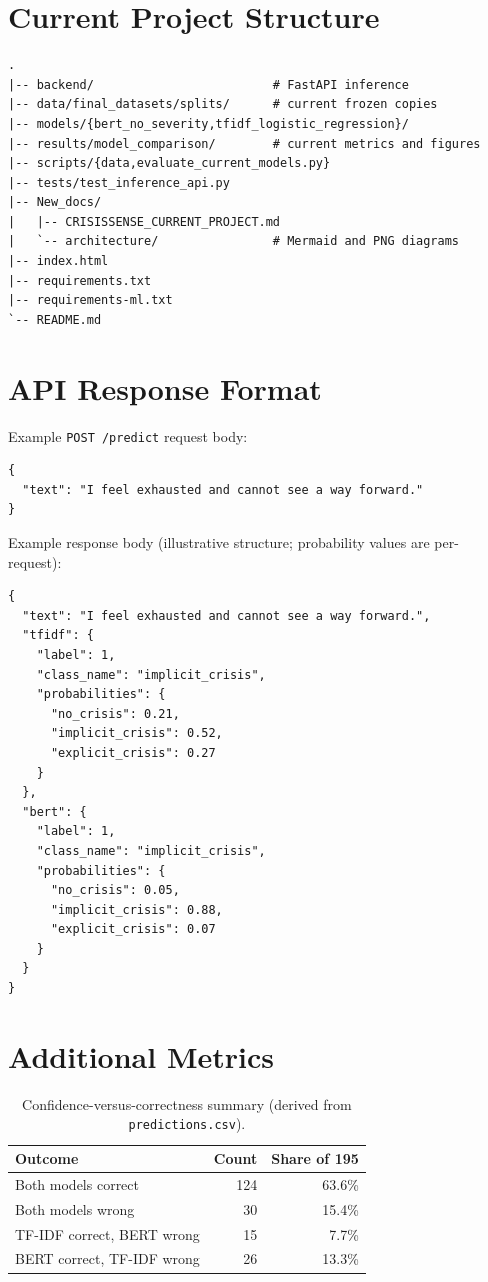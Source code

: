 \chapter{Current Project Structure}

\begin{lstlisting}
.
|-- backend/                         # FastAPI inference
|-- data/final_datasets/splits/      # current frozen copies
|-- models/{bert_no_severity,tfidf_logistic_regression}/
|-- results/model_comparison/        # current metrics and figures
|-- scripts/{data,evaluate_current_models.py}
|-- tests/test_inference_api.py
|-- New_docs/
|   |-- CRISISSENSE_CURRENT_PROJECT.md
|   `-- architecture/                # Mermaid and PNG diagrams
|-- index.html
|-- requirements.txt
|-- requirements-ml.txt
`-- README.md
\end{lstlisting}

\chapter{API Response Format}

Example \texttt{POST /\pbrk predict} request body:
\begin{lstlisting}
{
  "text": "I feel exhausted and cannot see a way forward."
}
\end{lstlisting}

Example response body (illustrative structure; probability values are per-request):
\begin{lstlisting}
{
  "text": "I feel exhausted and cannot see a way forward.",
  "tfidf": {
    "label": 1,
    "class_name": "implicit_crisis",
    "probabilities": {
      "no_crisis": 0.21,
      "implicit_crisis": 0.52,
      "explicit_crisis": 0.27
    }
  },
  "bert": {
    "label": 1,
    "class_name": "implicit_crisis",
    "probabilities": {
      "no_crisis": 0.05,
      "implicit_crisis": 0.88,
      "explicit_crisis": 0.07
    }
  }
}
\end{lstlisting}

\chapter{Additional Metrics}

\begin{table}[H]
\centering
\caption{Confidence-versus-correctness summary (derived from \texttt{predictions.csv}).}
\begin{tabular}{lrr}
\toprule
\textbf{Outcome} & \textbf{Count} & \textbf{Share of 195} \\
\midrule
Both models correct       & 124 & 63.6\% \\
Both models wrong         & 30  & 15.4\% \\
TF-IDF correct, BERT wrong & 15 & 7.7\%  \\
BERT correct, TF-IDF wrong & 26 & 13.3\% \\
\bottomrule
\end{tabular}
\end{table}

